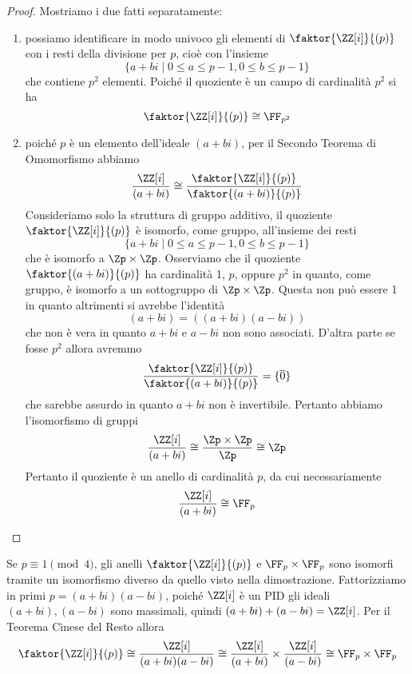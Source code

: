 \documentclass[11pt]{scrartcl}
\begin{document}
	\begin{proof} 
		Mostriamo i due fatti separatamente:
		\begin{enumerate}[(1)]
			\item possiamo identificare in modo univoco gli elementi di 
			$\faktor{\ZZ[i]}{(p)}$ con i resti della divisione per $p$, cioè
			con l'insieme 
			\[
			\{a + bi \mid 0 \leq a \leq p - 1, 0 \leq b \leq p - 1\}
			\]
			che contiene $p^2$ elementi. Poiché il quoziente è un campo di cardinalità
			$p^2$ si ha
			\[
			\faktor{\ZZ[i]}{(p)}\cong \FF_{p^2}
			\]
			\item poiché $p$ è un elemento dell'ideale $(a + bi)$, per il 
			Secondo Teorema di Omomorfismo abbiamo 
			\[
			\frac{\ZZ[i]}{(a + bi)} \cong \frac{\faktor{\ZZ[i]}{(p)}}{\faktor{(a + bi)}{(p)}}
			\]
			Consideriamo solo la struttura di gruppo additivo, il quoziente 
			$\faktor{\ZZ[i]}{(p)}$ è isomorfo, come gruppo, all'insieme
			dei resti 
			\[
			\{a + bi \mid 0\leq a\leq p - 1, 0\leq b\leq p -1\}
			\]
			che è isomorfo a $\Zp\times\Zp$. Osserviamo che il quoziente
			$\faktor{(a + bi)}{(p)}$ ha cardinalità 1, $p$, oppure $p^2$ in quanto,
			come gruppo, è isomorfo a un sottogruppo di $\Zp\times\Zp$. Questa 
			non può essere 1 in quanto altrimenti si avrebbe l'identità
			\[
			(a + bi) = ((a + bi)(a - bi))
			\]
			che non è vera in quanto $a + bi$ e $a - bi$ non sono associati. D'altra 
			parte se fosse $p^2$ allora avremmo
			\[
			\frac{\faktor{\ZZ[i]}{(p)}}{\faktor{(a + bi)}{(p)}} = \{\overline{0}\}
			\]
			che sarebbe assurdo in quanto $a + bi$ non è invertibile. Pertanto 
			abbiamo l'isomorfismo di gruppi
			\[
			\frac{\ZZ[i]}{(a + bi)} \cong \frac{\Zp \times \Zp}{\Zp} \cong \Zp
			\]
			Pertanto il quoziente è un anello di cardinalità $p$, da cui necessariamente
			\[
			\frac{\ZZ[i]}{(a + bi)} \cong \FF_p
			\]
		\end{enumerate}
	\end{proof}
	
	\begin{remark}
		Se $p \equiv 1 \pmod 4$, gli anelli $\faktor{\ZZ[i]}{(p)}$ e $\FF_p \times \FF_p$
		sono isomorfi tramite un isomorfismo diverso da quello visto nella dimostrazione.
		Fattorizziamo in primi $p = (a + bi)(a - bi)$, poiché $\ZZ[i]$ è un PID
		gli ideali $(a + bi), (a - bi)$ sono massimali, quindi $(a + bi) + (a - bi) = \ZZ[i]$.
		Per il Teorema Cinese del Resto allora
		\[
		\faktor{\ZZ[i]}{(p)} \cong \frac{\ZZ[i]}{(a + bi)(a - bi)} \cong
		\frac{\ZZ[i]}{(a + bi)} \times \frac{\ZZ[i]}{(a - bi)} \cong \FF_p \times \FF_p
		\]
	\end{remark}
	
\end{document}
